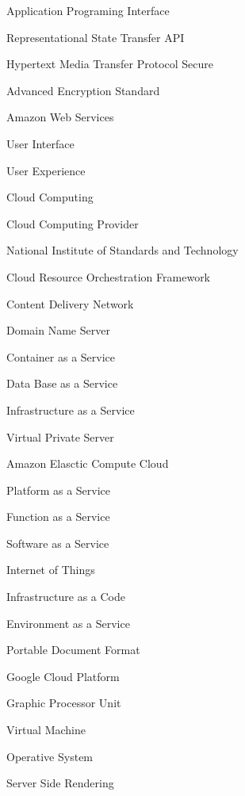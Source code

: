     {Application Programing Interface}

    {\gls{Representational State Transfer API}}

    {\gls{Hypertext Media Transfer Protocol Secure}}

    {Advanced Encryption Standard}
 
    {\gls{Amazon Web Services}}
  
    {\gls{User Interface}}

    {User Experience}

    {\gls{Cloud Computing}}

    {\gls{Cloud Computing Provider}}

    {National Institute of Standards and Technology}

    {Cloud Resource Orchestration Framework}

    {Content Delivery Network}

    {Domain Name Server}

    {Container as a Service}

    {Data Base as a Service}

    {Infrastructure as a Service}

    {Virtual Private Server}

    {Amazon Elasctic Compute Cloud}

    {Platform as a Service}

    {Function as a Service}

    {Software as a Service}

    {Internet of Things}

    {Infrastructure as a Code}

    {Environment as a Service}

    {Portable Document Format}

    {Google Cloud Platform}

    {Graphic Processor Unit}

    {Virtual Machine}

    {Operative System}

    {Server Side Rendering}
